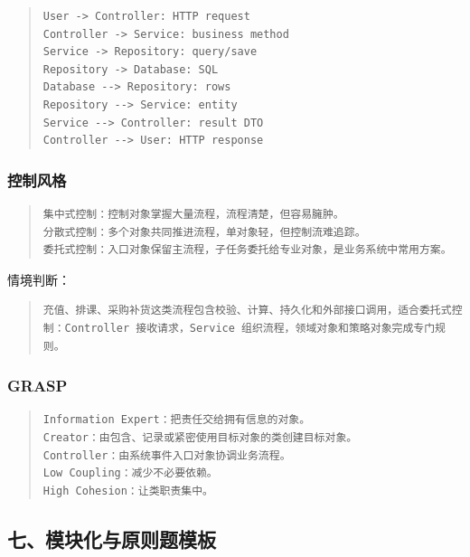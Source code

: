 \documentclass[UTF8,zihao=-4]{ctexart}
\begin{document}
\begin{quote}
\footnotesize
\begin{verbatim}
User -> Controller: HTTP request
Controller -> Service: business method
Service -> Repository: query/save
Repository -> Database: SQL
Database --> Repository: rows
Repository --> Service: entity
Service --> Controller: result DTO
Controller --> User: HTTP response
\end{verbatim}
\end{quote}


\subsubsection{控制风格}


\begin{quote}
\footnotesize
\begin{verbatim}
集中式控制：控制对象掌握大量流程，流程清楚，但容易臃肿。
分散式控制：多个对象共同推进流程，单对象轻，但控制流难追踪。
委托式控制：入口对象保留主流程，子任务委托给专业对象，是业务系统中常用方案。
\end{verbatim}
\end{quote}


情境判断：


\begin{quote}
\footnotesize
\begin{verbatim}
充值、排课、采购补货这类流程包含校验、计算、持久化和外部接口调用，适合委托式控制：Controller 接收请求，Service 组织流程，领域对象和策略对象完成专门规则。
\end{verbatim}
\end{quote}


\subsubsection{GRASP}


\begin{quote}
\footnotesize
\begin{verbatim}
Information Expert：把责任交给拥有信息的对象。
Creator：由包含、记录或紧密使用目标对象的类创建目标对象。
Controller：由系统事件入口对象协调业务流程。
Low Coupling：减少不必要依赖。
High Cohesion：让类职责集中。
\end{verbatim}
\end{quote}


\subsection{七、模块化与原则题模板}
\end{document}
